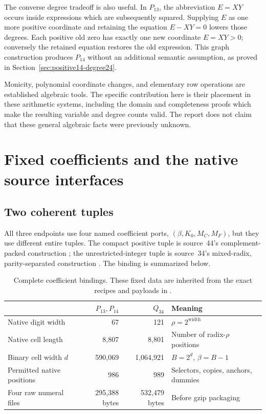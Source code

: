 \documentclass[11pt,a4paper]{article}
\theoremstyle{definition}
\begin{document}
The converse degree tradeoff is also useful.  In \(P_{13}\), the
abbreviation \(E=XY\) occurs inside expressions which are subsequently
squared.  Supplying \(E\) as one more positive coordinate and retaining
the equation \(E-XY=0\) lowers those degrees.  Each positive old zero
has exactly one new coordinate \(E=XY>0\); conversely the retained
equation restores the old expression.  This graph construction produces
\(P_{14}\) without an additional semantic assumption, as proved in
Section~\ref{sec:positive14-degree24}.

Monicity, polynomial coordinate changes, and elementary row operations
are established algebraic tools.  The specific contribution here is
their placement in these arithmetic systems, including the domain and
completeness proofs which make the resulting variable and degree
counts valid.  The report does not claim that these general algebraic
facts were previously unknown.

\section{Fixed coefficients and the native source interfaces}
\label{sec:coefficients}

\subsection{Two coherent tuples}

All three endpoints use four named coefficient ports,
\((\beta,K_0,M_C,M_F)\), but they use different entire tuples.  The compact
positive tuple is source~44's complement-packed construction
\cite{source44}; the unrestricted-integer tuple is source~34's
mixed-radix, parity-separated construction \cite{source34}.
The binding is summarized below.

\begin{table}[htbp]
\centering
\small
\begin{tabularx}{\textwidth}{@{}lrrX@{}}
\toprule
 & \(P_{13},P_{14}\) & \(Q_{34}\) & Meaning\\
\midrule
Native digit width & 67 & 121 & \(\rho=2^{\text{width}}\)\\
Native cell length & 8,807 & 8,801 & Number of radix-\(\rho\) positions\\
Binary cell width \(d\) & 590,069 & 1,064,921 & \(B=2^d\), \(\beta=B-1\)\\
Permitted native positions & 986 & 989 & Selectors, copies, anchors, dummies\\
Four raw numeral files & 295,388 bytes & 532,479 bytes & Before gzip packaging\\
\bottomrule
\end{tabularx}
\caption{Complete coefficient bindings.  These fixed data are inherited
from the exact recipes and payloads in \cite{source44,source34}.}
\label{tab:coefficients}
\end{table}
\end{document}
